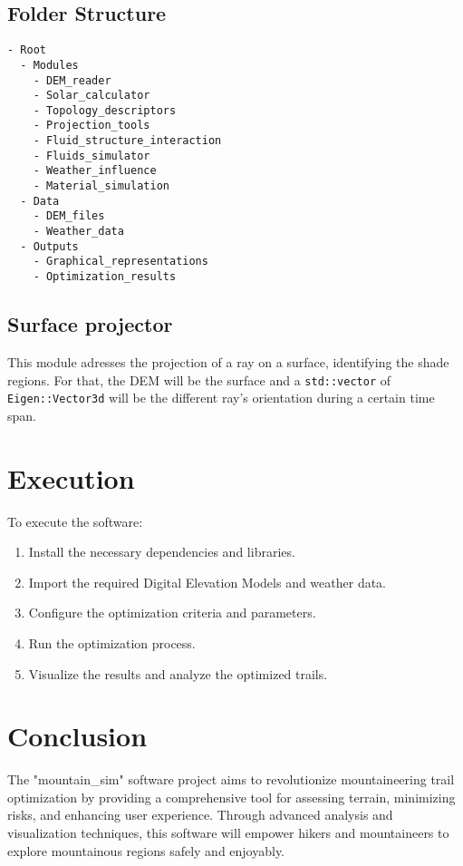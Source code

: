 \documentclass{article}
\begin{document}
\subsection{Folder Structure}
\begin{verbatim}
- Root
  - Modules
    - DEM_reader
    - Solar_calculator
    - Topology_descriptors
    - Projection_tools
    - Fluid_structure_interaction
    - Fluids_simulator
    - Weather_influence
    - Material_simulation
  - Data
    - DEM_files
    - Weather_data
  - Outputs
    - Graphical_representations
    - Optimization_results
\end{verbatim}
\subsection{Surface projector}
This module adresses the projection of a ray on a surface, identifying the shade regions. For that, the DEM will be the surface and a \texttt{std::vector} of \texttt{Eigen::Vector3d} will be the different ray's orientation during a certain time span.  

\section{Execution}
To execute the software:
\begin{enumerate}
    \item Install the necessary dependencies and libraries.
    \item Import the required Digital Elevation Models and weather data.
    \item Configure the optimization criteria and parameters.
    \item Run the optimization process.
    \item Visualize the results and analyze the optimized trails.
\end{enumerate}

\section{Conclusion}
The "mountain\_sim" software project aims to revolutionize mountaineering trail optimization by providing a comprehensive tool for assessing terrain, minimizing risks, and enhancing user experience. Through advanced analysis and visualization techniques, this software will empower hikers and mountaineers to explore mountainous regions safely and enjoyably.
\end{document}
